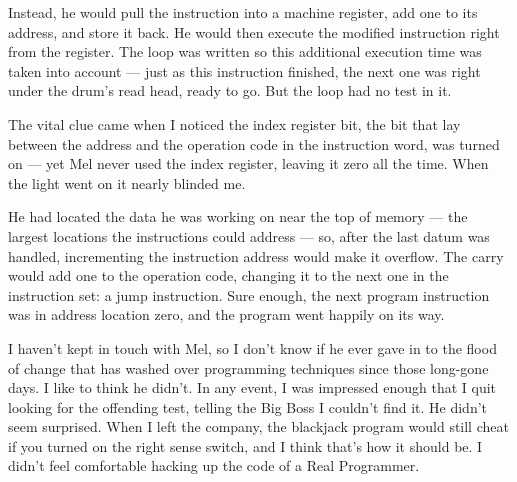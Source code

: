 \documentclass[12pt]{article}
\begin{document}
\bigskip
\noindent
Instead, he would pull the instruction into a machine
register, add one to its address, and store it back. He
would then execute the modified instruction right from the
register. The loop was written so this additional execution
time was taken into account --- just as this instruction
finished, the next one was right under the drum's read head,
ready to go. But the loop had no test in it.

\bigskip
\noindent
The vital clue came when I noticed the index register bit,
the bit that lay between the address and the operation code
in the instruction word, was turned on --- yet Mel never used
the index register, leaving it zero all the time. When the
light went on it nearly blinded me.

\bigskip
\noindent
He had located the data he was working on near the top of
memory --- the largest locations the instructions could
address --- so, after the last datum was handled,
incrementing the instruction address would make it overflow.
The carry would add one to the operation code, changing it
to the next one in the instruction set: a jump instruction.
Sure enough, the next program instruction was in address
location zero, and the program went happily on its way.

\bigskip
\noindent
I haven't kept in touch with Mel, so I don't know if he ever
gave in to the flood of change that has washed over
programming techniques since those long-gone days. I like
to think he didn't. In any event, I was impressed enough
that I quit looking for the offending test, telling the Big
Boss I couldn't find it. He didn't seem surprised. When I
left the company, the blackjack program would still cheat if
you turned on the right sense switch, and I think that's how
it should be. I didn't feel comfortable hacking up the code
of a Real Programmer.
\end{document}
